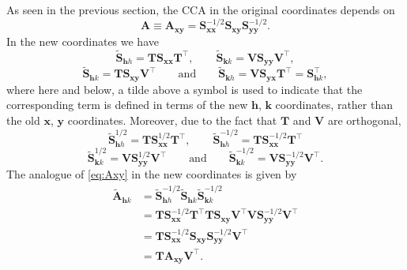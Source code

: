 \documentclass[]{book}
\theoremstyle{definition}
\theoremstyle{definition}
\theoremstyle{definition}
\theoremstyle{remark}
\begin{document}
As seen in the previous section, the CCA in the original coordinates depends on
\begin{equation}
\boldsymbol A\equiv \boldsymbol A_{\boldsymbol x\boldsymbol y}=\boldsymbol S_{\boldsymbol x\boldsymbol x}^{-1/2}\boldsymbol S_{\boldsymbol x\boldsymbol y}\boldsymbol S_{\boldsymbol y\boldsymbol y}^{-1/2}.
\label{eq:Axy}
\end{equation}
In the new coordinates we have
\[
\tilde{\boldsymbol S}_{\mathbf h h}={\mathbf T} \boldsymbol S_{\boldsymbol x\boldsymbol x}{\mathbf T}^\top, \qquad \tilde{\boldsymbol S}_{\mathbf kk}={\mathbf V}\boldsymbol S_{\boldsymbol y\boldsymbol y}{\mathbf V}^\top,
\]
\[
\tilde{\boldsymbol S}_{\mathbf hk}={\mathbf T}\boldsymbol S_{\boldsymbol x\boldsymbol y}{\mathbf V}^\top \qquad \text{and} \qquad
\tilde{\boldsymbol S}_{\mathbf kh}={\mathbf V}\boldsymbol S_{\boldsymbol y\boldsymbol x}{\mathbf T}^\top=\boldsymbol S_{\mathbf h k}^\top,
\]
where here and below, a tilde above a symbol is used to indicate that the corresponding term is defined in terms of the new \(\boldsymbol h\), \(\boldsymbol k\) coordinates, rather
than the old \(\boldsymbol x\), \(\boldsymbol y\) coordinates.
Moreover, due to the fact that \(\mathbf T\) and \(\mathbf V\) are orthogonal,
\[
\tilde{\boldsymbol S}_{\mathbf hh}^{ 1/2}={\mathbf T}\boldsymbol S_{\boldsymbol x\boldsymbol x}^{ 1/2}{\mathbf T}^\top, \qquad
\tilde{\boldsymbol S}_{\mathbf hh}^{ -1/2}={\mathbf T}\boldsymbol S_{\boldsymbol x\boldsymbol x}^{ -1/2}{\mathbf T}^\top
\]
\[
\tilde{\boldsymbol S}_{\mathbf kk}^{ 1/2}={\mathbf V}\boldsymbol S_{\boldsymbol y\boldsymbol y}^{ 1/2}{\mathbf V}^\top \qquad \text{and} \qquad
\tilde{\boldsymbol S}_{\mathbf kk}^{ -1/2}={\mathbf V}\boldsymbol S_{\boldsymbol y\boldsymbol y}^{- 1/2}{\mathbf V}^\top.
\]
The analogue of \eqref{eq:Axy} in the new coordinates is given by
\begin{align*}
\tilde{\boldsymbol A}_{\mathbf h k}&=\tilde{\boldsymbol S}_{\mathbf hh}^{-1/2}\tilde{\boldsymbol S}_{\mathbf h k}\tilde{\boldsymbol S}_{\mathbf kk}^{-1/2}\\
&={\mathbf T} \boldsymbol S_{\boldsymbol x\boldsymbol x}^{-1/2}{\mathbf T}^\top {\mathbf T}\boldsymbol S_{\boldsymbol x\boldsymbol y}{\mathbf V}^\top {\mathbf V}\boldsymbol S_{\boldsymbol y\boldsymbol y}^{-1/2}{\mathbf V}^\top\\
&={\mathbf T}\boldsymbol S_{\boldsymbol x\boldsymbol x}^{-1/2}\boldsymbol S_{\boldsymbol x\boldsymbol y}\boldsymbol S_{\boldsymbol y\boldsymbol y}^{-1/2}{\mathbf V}^\top\\
&={\mathbf T} \boldsymbol A_{\boldsymbol x\boldsymbol y}{\mathbf V}^\top.
\end{align*}
\end{document}
